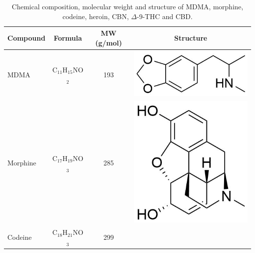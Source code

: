 \begin{table}
\centering
\caption{Chemical composition, molecular weight and structure of MDMA, morphine, codeine, heroin, CBN, $\Delta$-9-THC and CBD.}
\begin{tabular}{lccc}
\textbf{Compound} & \textbf{Formula} &\textbf{MW (g/mol)} &  \textbf{Structure} \\ 
\toprule
MDMA & C$_{11}$H$_{15}$NO$_2$ & 193 &  
\begin{minipage}[c]{0.3\linewidth}\centering
\includegraphics[height=0.05\textheight]{pics/other_drugs/MDMA_struct.png}\end{minipage}\\ \midrule
Morphine & C$_{17}$H$_{19}$NO$_3$ & 285 &  
\begin{minipage}[c]{0.3\linewidth}\centering
\includegraphics[height=0.12\textheight]{pics/other_drugs/morphine_struct.png}\end{minipage}\\ \midrule
Codeine & C$_{18}$H$_{21}$NO$_3$ & 299 &  
\begin{minipage}[c]{0.3\linewidth}\centering

\end{minipage}
\end{tabular}
\end{table}
